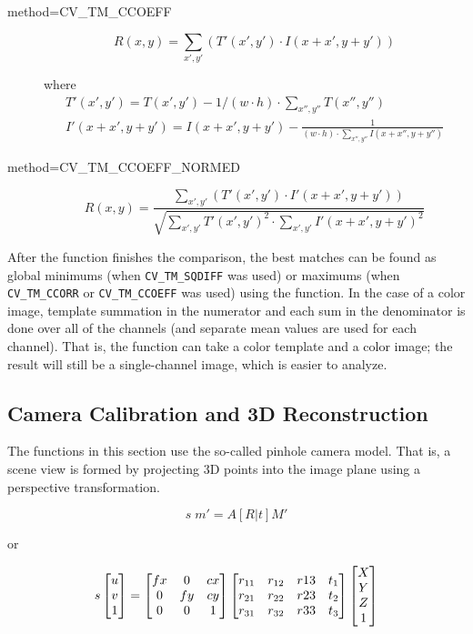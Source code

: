 \begin{description}
\begin{description}
\item[method=CV\_TM\_CCOEFF]
\[ R(x,y)=\sum_{x',y'} (T'(x',y') \cdot I(x+x',y+y')) \]

where
\[ 
\begin{array}{l}
T'(x',y')=T(x',y') - 1/(w \cdot h) \cdot \sum_{x'',y''} T(x'',y'')\\
I'(x+x',y+y')=I(x+x',y+y') - \frac{1}{(w \cdot h) \cdot \sum_{x'',y''} I(x+x'',y+y'')}
\end{array}
\]

\item[method=CV\_TM\_CCOEFF\_NORMED]
\[ R(x,y)=\frac
{ \sum_{x',y'} (T'(x',y') \cdot I'(x+x',y+y')) }
{ \sqrt{\sum_{x',y'}T'(x',y')^2 \cdot \sum_{x',y'} I'(x+x',y+y')^2} }
\]
\end{description}

After the function finishes the comparison, the best matches can be found as global minimums (when \texttt{CV\_TM\_SQDIFF} was used) or maximums (when \texttt{CV\_TM\_CCORR} or \texttt{CV\_TM\_CCOEFF} was used) using the  function. In the case of a color image, template summation in the numerator and each sum in the denominator is done over all of the channels (and separate mean values are used for each channel). That is, the function can take a color template and a color image; the result will still be a single-channel image, which is easier to analyze.


\subsection{Camera Calibration and 3D Reconstruction}

The functions in this section use the so-called pinhole camera model. That
is, a scene view is formed by projecting 3D points into the image plane
using a perspective transformation.

\[
s \; m' = A [R|t] M'
\]

or

\[
s \begin{bmatrix} u\\ v\\ 1 \end{bmatrix} = \begin{bmatrix} fx & 0 & cx\\ 0 & fy & cy\\ 0 & 0 & 1 \end{bmatrix}
\begin{bmatrix}
 r_{11} & r_{12} & r{13} & t_1 \\
 r_{21} & r_{22} & r{23} & t_2 \\
 r_{31} & r_{32} & r{33} & t_3
\end{bmatrix}
\begin{bmatrix}X\\Y\\Z\\1 \end{bmatrix}
\]


\end{description}
